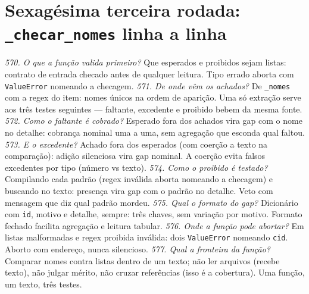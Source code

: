 \section{Sexagésima terceira rodada: \texttt{\_checar\_nomes} linha a linha}
\textit{570. O que a função valida primeiro?} Que esperados e proibidos sejam listas: contrato de entrada checado antes de qualquer leitura. Tipo errado aborta com \texttt{ValueError} nomeando a checagem.
\textit{571. De onde vêm os achados?} De \texttt{\_nomes} com a regex do item: nomes únicos na ordem de aparição. Uma só extração serve aos três testes seguintes --- faltante, excedente e proibido bebem da mesma fonte.
\textit{572. Como o faltante é cobrado?} Esperado fora dos achados vira gap com o nome no detalhe: cobrança nominal uma a uma, sem agregação que esconda qual faltou.
\textit{573. E o excedente?} Achado fora dos esperados (com coerção a texto na comparação): adição silenciosa vira gap nominal. A coerção evita falsos excedentes por tipo (número vs texto).
\textit{574. Como o proibido é testado?} Compilando cada padrão (regex inválida aborta nomeando a checagem) e buscando no texto: presença vira gap com o padrão no detalhe. Veto com mensagem que diz qual padrão mordeu.
\textit{575. Qual o formato do gap?} Dicionário com \texttt{id}, motivo e detalhe, sempre: três chaves, sem variação por motivo. Formato fechado facilita agregação e leitura tabular.
\textit{576. Onde a função pode abortar?} Em listas malformadas e regex proibida inválida: dois \texttt{ValueError} nomeando \texttt{cid}. Aborto com endereço, nunca silencioso.
\textit{577. Qual a fronteira da função?} Comparar nomes contra listas dentro de um texto; não ler arquivos (recebe texto), não julgar mérito, não cruzar referências (isso é a cobertura). Uma função, um texto, três testes.
